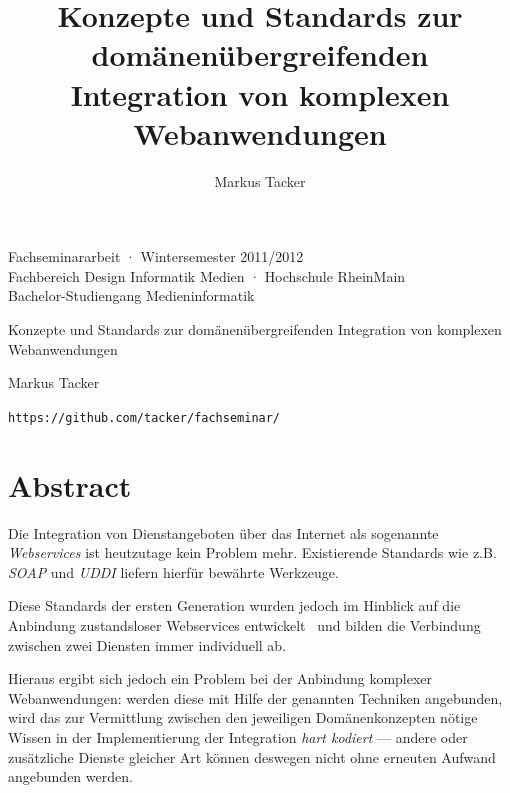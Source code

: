 \documentclass[10pt,a4paper]{article}
\begin{document}
\author{Markus Tacker}
\title{Konzepte und Standards zur domänenübergreifenden Integration von komplexen Webanwendungen}

\begin{center}

\begin{small}Fachseminararbeit · Wintersemester 2011/2012\\Fachbereich Design Informatik Medien · Hochschule RheinMain\\Bachelor-Studiengang Medieninformatik\end{small}

\bigskip

\begin{huge}Konzepte und Standards 
\medskip
zur domänenübergreifenden Integration
\medskip
von komplexen Webanwendungen\end{huge}

\bigskip

\begin{large}Markus Tacker\end{large}

\begin{small}\texttt{https://github.com/tacker/fachseminar/}\end{small}

\end{center}

\section*{Abstract}

Die Integration von Dienstangeboten über das Internet als sogenannte 
\emph{Webservices} ist heutzutage kein Problem mehr. Existierende Standards
wie z.B. \emph{\ac{SOAP}} und \emph{\ac{UDDI}} liefern hierfür bewährte Werkzeuge.

Diese Standards der ersten Generation wurden jedoch im Hinblick auf 
die Anbindung zustandsloser Webservices entwickelt~\cite[S. 653]{ei-sawsdl} 
und bilden die Verbindung zwischen zwei Diensten immer individuell ab.

Hieraus ergibt sich jedoch ein Problem bei der Anbindung komplexer 
Webanwendungen: werden diese mit Hilfe der genannten Techniken 
angebunden, wird das zur Vermittlung zwischen den jeweiligen Domänenkonzepten
nötige Wissen in der Implementierung der Integration \emph{hart kodiert} --- 
andere oder zusätzliche Dienste gleicher Art können deswegen nicht ohne erneuten
Aufwand angebunden werden.
\end{document}
